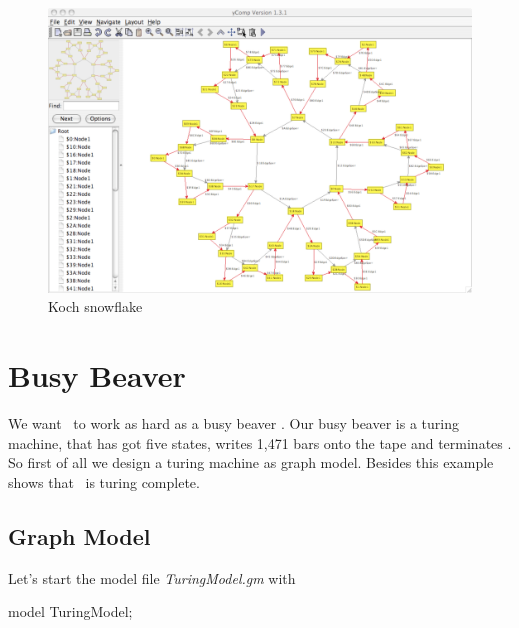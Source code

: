 \begin{figure}[htbp]
  \centering
  \includegraphics[width=0.8\linewidth]{fig/snowflake}
  \caption{Koch snowflake}
\end{figure}


\section{Busy Beaver}
We want \GrG\ to work as hard as a busy beaver \cite{kroll, bb}. Our busy beaver is a turing machine, that has got five states, writes 1,471 bars onto the tape and terminates \cite{beaver}. So first of all we design a turing machine as graph model. Besides this example shows that \GrG\ is turing complete. 

\subsection{Graph Model}
Let's start the model file \emph{TuringModel.gm} with
\begin{grgen}[firstnumber=1]
model TuringModel; 

\end{grgen}

